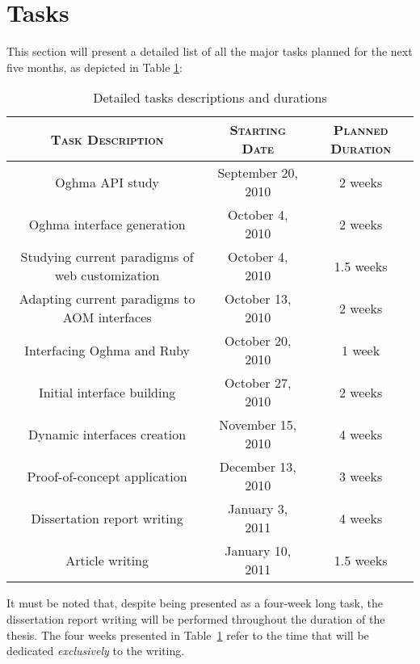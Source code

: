 \section{Tasks}\label{sec:tasks}

This section will present a detailed list of all the major tasks planned for the next five months, as depicted in Table \ref{table:tasks}:

\begin{table}[H]
  \centering
  \begin{tabular}{c|c|c}
    \textbf{\textsc{Task Description}} & \textbf{\textsc{Starting Date}} & \textbf{\textsc{Planned Duration}}\\
    \hline
    \hline
    Oghma API study                                 & September 20, 2010  & 2 weeks\\\hline
    Oghma interface generation                      & October 4, 2010     & 2 weeks\\\hline
    Studying current paradigms of web customization & October 4, 2010     & 1.5 weeks\\\hline
    Adapting current paradigms to AOM interfaces    & October 13, 2010    & 2 weeks\\\hline
    Interfacing Oghma and Ruby                      & October 20, 2010    & 1 week\\\hline
    Initial interface building                      & October 27, 2010    & 2 weeks\\\hline
    Dynamic interfaces creation                     & November 15, 2010   & 4 weeks\\\hline
    Proof-of-concept application                    & December 13, 2010   & 3 weeks\\\hline
    Dissertation report writing                     & January 3, 2011     & 4 weeks\\\hline
    Article writing                                 & January 10, 2011    & 1.5 weeks\\\hline
  \end{tabular}
  \vspace{3mm}
  \caption{Detailed tasks descriptions and durations}
  \label{table:tasks}
\end{table}

It must be noted that, despite being presented as a four-week long task, the dissertation report writing will be performed throughout the duration of the thesis. The four weeks presented in Table~\ref{table:tasks} refer to the time that will be dedicated \emph{exclusively} to the writing.


